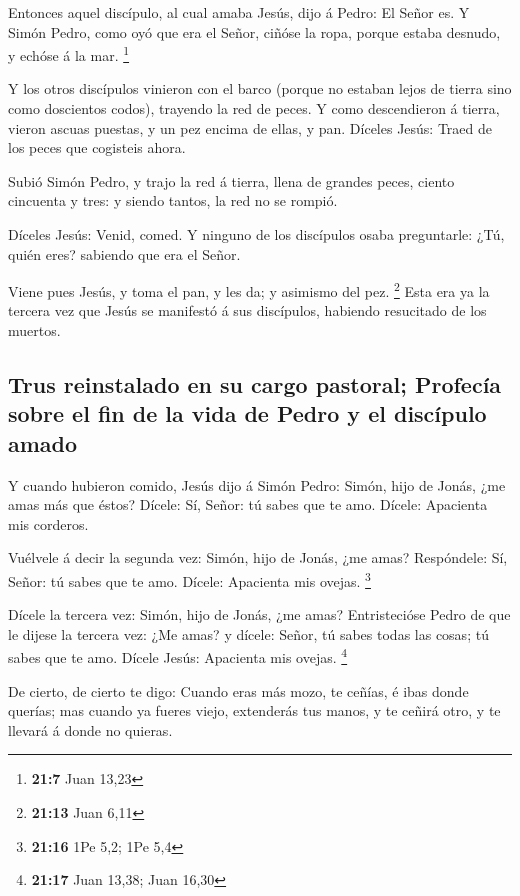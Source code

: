  Entonces aquel discípulo, al cual amaba Jesús, dijo á
Pedro: El Señor es. Y Simón Pedro, como oyó que era el Señor, ciñóse la
ropa, porque estaba desnudo, y echóse á la mar. \footnote{\textbf{21:7}
  Juan 13,23}

 Y los otros discípulos vinieron con el barco (porque no
estaban lejos de tierra sino como doscientos codos), trayendo la red de
peces.  Y como descendieron á tierra, vieron ascuas puestas,
y un pez encima de ellas, y pan.  Díceles Jesús: Traed de
los peces que cogisteis ahora.

 Subió Simón Pedro, y trajo la red á tierra, llena de
grandes peces, ciento cincuenta y tres: y siendo tantos, la red no se
rompió.

 Díceles Jesús: Venid, comed. Y ninguno de los discípulos
osaba preguntarle: ¿Tú, quién eres? sabiendo que era el Señor.

 Viene pues Jesús, y toma el pan, y les da; y asimismo del
pez. \footnote{\textbf{21:13} Juan 6,11}  Esta era ya la
tercera vez que Jesús se manifestó á sus discípulos, habiendo resucitado
de los muertos.

\hypertarget{trus-reinstalado-en-su-cargo-pastoral-profecuxeda-sobre-el-fin-de-la-vida-de-pedro-y-el-discuxedpulo-amado}{%
\subsection{Trus reinstalado en su cargo pastoral; Profecía sobre el fin
de la vida de Pedro y el discípulo
amado}\label{trus-reinstalado-en-su-cargo-pastoral-profecuxeda-sobre-el-fin-de-la-vida-de-pedro-y-el-discuxedpulo-amado}}

 Y cuando hubieron comido, Jesús dijo á Simón Pedro: Simón,
hijo de Jonás, ¿me amas más que éstos? Dícele: Sí, Señor: tú sabes que
te amo. Dícele: Apacienta mis corderos.

 Vuélvele á decir la segunda vez: Simón, hijo de Jonás, ¿me
amas? Respóndele: Sí, Señor: tú sabes que te amo. Dícele: Apacienta mis
ovejas. \footnote{\textbf{21:16} 1Pe 5,2; 1Pe 5,4}

 Dícele la tercera vez: Simón, hijo de Jonás, ¿me amas?
Entristecióse Pedro de que le dijese la tercera vez: ¿Me amas? y dícele:
Señor, tú sabes todas las cosas; tú sabes que te amo. Dícele Jesús:
Apacienta mis ovejas. \footnote{\textbf{21:17} Juan 13,38; Juan 16,30}

 De cierto, de cierto te digo: Cuando eras más mozo, te
ceñías, é ibas donde querías; mas cuando ya fueres viejo, extenderás tus
manos, y te ceñirá otro, y te llevará á donde no quieras.

